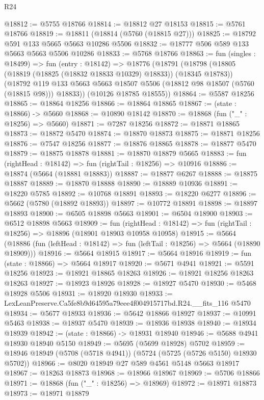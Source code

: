 \begin{lexlean}{R24}
\begin{coremodule}
@18812 := @5755 @18766
@18814 := @18812 @27 @18153
@18815 := @5761 @18766
@18819 := @18811 (@18814 (@5760 (@18815 @27)))
@18825 := @18792 @591 @133 @5665 @5663 @10286 @5506
@18832 := @18777 @506 @589 @133 @5663 @5663 @5506 @10286
@18833 := @5768 @18766
@18863 := fun (singles : @18499) =>
  fun (entry : @18142) =>
  @18776
    (@18791
      (@18798
        (@18805 (@18819 (@18825 (@18832 @18833 @10329) @18833)) (@18345 @18783))
        (@18792 @119 @133 @5663 @5663 @18507 @5506 (@18812 @98 @18507 (@5760 (@18815 @98))) @18833))
      (@10126 @18785 @18555))
@18864 := @5587 @18256
@18865 := @18864 @18256
@18866 := @18864 @18865
@18867 := (state : @18866) -> @5660
@18868 := @10890 @18142
@18870 := @18868 (fun ("_" : @18256) => @5660)
@18871 := @7287 @18256
@18872 := @18871 @18865
@18873 := @18872 @5470
@18874 := @18870 @18873
@18875 := @18871 @18256
@18876 := @7547 @18256
@18877 := @18876 @18865
@18878 := @18877 @5470
@18879 := @18875 @18878
@18881 := @18870 @18879 @5665
@18883 := fun (rightHead : @18142) => fun (rightTail : @18256) => @10916
@18886 := @18874 (@5664 (@18881 @18883))
@18887 := @18877 @6267
@18888 := @18875 @18887
@18889 := @18870 @18888
@18890 := @18889 @10936
@18891 := @18220 @5785
@18892 := @10768 @18891
@18893 := @18220 @6277
@18896 := @5662 (@5780 (@18892 @18893))
@18897 := @10772 @18891
@18898 := @18897 @18893
@18900 := @6505 @18898 @5663
@18901 := @6504 @18900
@18903 := @6512 @18898 @5663
@18909 := fun (rightHead : @18142) =>
  fun (rightTail : @18256) => @18896 (@18901 @18903 @10958 @10958)
@18915 := @5664
    (@18886 (fun (leftHead : @18142) => fun (leftTail : @18256) => @5664 (@18890 @18909)))
@18916 := @5664 @18915
@18917 := @5664 @18916
@18919 := fun (state : @18866) => @5664 @18917
@18920 := @5671 @4941
@18921 := @5591 @18256
@18923 := @18921 @18865 @18263
@18926 := @18921 @18256 @18263 @18263
@18927 := @18923 @18926
@18928 := @18927 @5470
@18930 := @5468 @18928 @5506
@18931 := @18920 @18930
@18933 := LexLeanPreserve.Ca5fe8b9d64595a79eee4f004915717bd.R24.__fits_116 @5470
@18934 := @5677 @18933
@18936 := @5642 @18866 @18927
@18937 := @10991 @5463
@18938 := @18937 @5470
@18939 := @18936 @18938
@18940 := @18934 @18939
@18942 := (state : @18866) -> @18931 @18940
@18946 := @5688 @4941 @18930 @18940 @5150
@18949 := @5695 (@5699 @18928) @5702
@18959 := @18946 @18949 (@5708 (@5718 @4941)) (@5724 (@5725 (@5726 @5150) @18930 @5702))
@18966 := @8020 @18949 @27 @589 @4561 @5148 @5663 @18917
@18967 := @18263 @18873
@18968 := @18966 @18967
@18969 := @5706 @18866
@18971 := @18868 (fun ("_" : @18256) => @18969)
@18972 := @18971 @18873
@18973 := @18971 @18879

\end{coremodule}
\end{lexlean}
